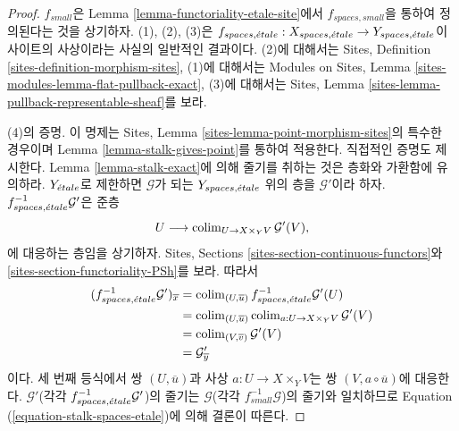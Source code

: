 \begin{proof}
$f_{small}$은 Lemma \ref{lemma-functoriality-etale-site}에서
$f_{spaces, small}$을 통하여 정의된다는 것을 상기하자.
(1), (2), (3)은
$f_{spaces, {\acute{e}tale}} :
X_{spaces, {\acute{e}tale}}
\to
Y_{spaces, {\acute{e}tale}}$이 사이트의 사상이라는 사실의 일반적인 결과이다.
(2)에 대해서는 Sites, Definition
\ref{sites-definition-morphism-sites}, (1)에 대해서는
Modules on Sites, Lemma
\ref{sites-modules-lemma-flat-pullback-exact}, (3)에 대해서는
Sites, Lemma \ref{sites-lemma-pullback-representable-sheaf}를 보라.

\medskip\noindent
(4)의 증명. 이 명제는 Sites, Lemma
\ref{sites-lemma-point-morphism-sites}의 특수한 경우이며
Lemma \ref{lemma-stalk-gives-point}를 통하여 적용한다.
직접적인 증명도 제시한다.
Lemma \ref{lemma-stalk-exact}에 의해 줄기를 취하는 것은 층화와
가환함에 유의하라.
$Y_{\acute{e}tale}$로 제한하면 $\mathcal{G}$가 되는
$Y_{spaces, {\acute{e}tale}}$ 위의 층을 $\mathcal{G}'$이라 하자.
$f_{spaces, {\acute{e}tale}}^{-1}\mathcal{G}'$은 준층
$$
U \longrightarrow \mathop{\mathrm{colim}}\nolimits_{U \to X \times_Y V} \mathcal{G}'(V),
$$
에 대응하는 층임을 상기하자. Sites, Sections
\ref{sites-section-continuous-functors}와
\ref{sites-section-functoriality-PSh}를 보라.
따라서
\begin{align*}
(f_{spaces, {\acute{e}tale}}^{-1}\mathcal{G}')_{\overline{x}}
& =
\mathop{\mathrm{colim}}\nolimits_{(U, \overline{u})} f_{spaces, {\acute{e}tale}}^{-1}\mathcal{G}'(U)
\\
& = \mathop{\mathrm{colim}}\nolimits_{(U, \overline{u})}
\mathop{\mathrm{colim}}\nolimits_{a : U \to X \times_Y V} \mathcal{G}'(V) \\
& = \mathop{\mathrm{colim}}\nolimits_{(V, \overline{v})} \mathcal{G}'(V) \\
& = \mathcal{G}'_{\overline{y}}
\end{align*}
이다. 세 번째 등식에서 쌍 $(U, \overline{u})$과 사상
$a : U \to X \times_Y V$는 쌍
$(V, a \circ \overline{u})$에 대응한다.
$\mathcal{G}'$(각각 $f_{spaces, {\acute{e}tale}}^{-1}\mathcal{G}'$)의 줄기는
$\mathcal{G}$(각각 $f_{small}^{-1}\mathcal{G}$)의 줄기와 일치하므로
Equation (\ref{equation-stalk-spaces-etale})에 의해 결론이 따른다.
\end{proof}

